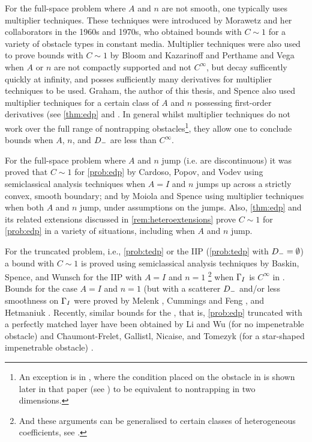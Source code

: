 For the full-space problem where $A$ and $n$ are not smooth, one typically uses multiplier techniques. These techniques were introduced by Morawetz and her collaborators in the 1960s and 1970s, who obtained bounds with $C \sim 1$ for a variety of obstacle types \cite{Mo:61,MoLu:68,Mo:75,MoRaSt:77} in constant media. Multiplier techniques were also used to prove bounds with $C \sim 1$ by Bloom and Kazarinoff \cite{Bl:73,BlKa:77} and Perthame and Vega \cite{PeVe:99} when $A$ or $n$ are not compactly supported and not $C^\infty$, but decay sufficently quickly at infinity, and posses sufficiently many derivatives for multiplier techniques to be used. Graham, the author of this thesis, and Spence also used multiplier techniques for a certain class of $A$ and $n$ possessing first-order derivatives (see \cref{thm:edp} and \cite{GrPeSp:19}. In general whilst multiplier techniques do not work over the full range of nontrapping obstacles\footnote{An exception is in \cite{Mo:75}, where the condition placed on the obstacle in \cite[Equation (1.3)]{Mo:75} is shown later in that paper (see \cite[Equation (1.3a)]{Mo:75}) to be equivalent to nontrapping in two dimensions.}, they allow one to conclude bounds when $A$, $n$, and $D_{-}$ are less than $C^\infty.$

For the full-space problem where $A$ and $n$ jump (i.e. are discontinuous) it was proved that $C \sim 1$ for \cref{prob:edp} by Cardoso, Popov, and Vodev \cite{CaPoVo:99,PoVo:99b} using semiclassical analysis techniques when $A=I$ and $n$ jumps up across a strictly convex, smooth boundary; and by Moiola and Spence \cite{MoSp:19} using multiplier techniques when both $A$ and $n$ jump, under assumptions on the jumps. Also, \cref{thm:edp} and its related extensions discussed in \cref{rem:heteroextensions} prove $C \sim 1$ for \cref{prob:edp} in a variety of situations, including when $A$ and $n$ jump.


For the truncated problem, i.e., \cref{prob:tedp} or the IIP (\cref{prob:tedp} with $D_{-}=\emptyset$) a bound with $C \sim 1$ is proved using semiclassical analysis techniques by Baskin, Spence, and Wunsch for the IIP with $A=I$ and $n=1$ \footnote{And these arguments can be generalised to certain classes of heterogeneous coefficients, see \cite[Remark 5.6]{BaSpWu:16}.} when $\Gamma_{I}$ is $C^\infty$ in \cite{BaSpWu:16}. Bounds for the case $A=I$ and $n=1$ (but with a scatterer $D_{-}$ and/or less smoothness on $\Gamma_{I}$ were proved by Melenk \cite{Me:95}, Cummings and Feng \cite{CuFe:06}, and Hetmaniuk \cite{He:07}. Recently, similar bounds for the , that is, \cref{prob:edp} truncated with a perfectly matched layer have been obtained by Li and Wu \cite{LiWu:18} (for no impenetrable obstacle) and Chaumont-Frelet, Gallistl, Nicaise, and Tomezyk (for a star-shaped impenetrable obstacle) \cite{ChGaNiTo:18}.

